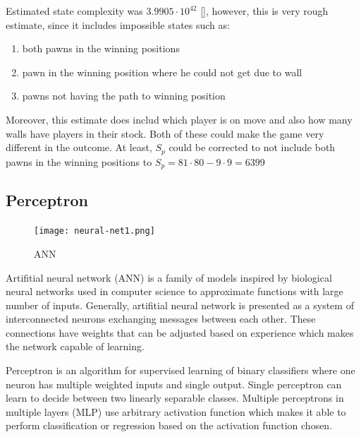 \documentclass[12pt, oneside]{book}
\begin{document}
    Estimated state complexity was $3.9905\cdot10^{42}$ [\cite{mertens}],
    however, this is very rough estimate, since it includes impossible states
    such as:
    \begin{enumerate}[topsep=0pt,itemsep=-1ex,partopsep=1ex,parsep=1ex]
      \setlength\itemsep{0em}
      \item both pawns in the winning positions
      \item pawn in the winning position where he could not get due to wall
      \item pawns not having the path to winning position
    \end{enumerate}

    Moreover, this estimate does includ which player is on move and also how
    many walls have players in their stock. Both of these could make the game
    very different in the outcome. At least, $S_p$ could be corrected to not
    include both pawns in the winning positions to
    $S_p = 81\cdot80 - 9\cdot9 = 6399$

  \subsection{Perceptron}

    \begin{figure}
      \vspace*{-0.45cm}
      \centering
      \texttt{[image: neural-net1.png]}
      \vspace*{-1.45cm}
      \caption{ANN}
      \label{fig:network}
      \vspace*{-1.30cm}
    \end{figure}

    Artifitial neural network (ANN) is a family of models inspired by biological
    neural networks used in computer science to approximate functions with
    large number of inputs. Generally, artifitial neural network is presented
    as a system of interconnected neurons exchanging messages between each
    other. These connections have weights that can be adjusted based on
    experience which makes the network capable of learning.

    Perceptron is an algorithm for supervised learning of binary classifiers
    where one neuron has multiple weighted inputs and single output. Single
    perceptron can learn to decide between two linearly separable
    classes. Multiple perceptrons in multiple layers (MLP) use arbitrary
    activation function which makes it able to perform classification or
    regression based on the activation function chosen.




\end{document}
